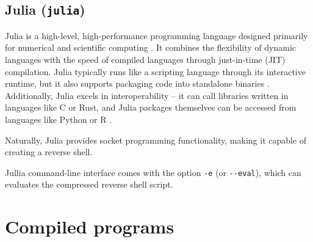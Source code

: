 




\subsection{Julia (\texttt{julia})}


Julia is a high-level, high-performance programming language designed primarily for numerical and scientific computing \cite{julia-intro}. It combines the flexibility of dynamic languages with the speed of compiled languages through just-in-time (JIT) compilation. Julia typically runs like a scripting language through its interactive runtime, but it also supports packaging code into standalone binaries \cite{julia-compiler}. Additionally, Julia excels in interoperability -- it can call libraries written in languages like C or Rust, and Julia packages themselves can be accessed from languages like Python or R \cite{julia-calling-c}.

Naturally, Julia provides socket programming functionality, making it capable of creating a reverse shell.



Jullia command-line interface comes with the option \texttt{-e} (or \texttt{-{}-eval}), which can evaluates the compressed reverse shell script.



\section{Compiled programs}
\label{sec:program-compilers}


